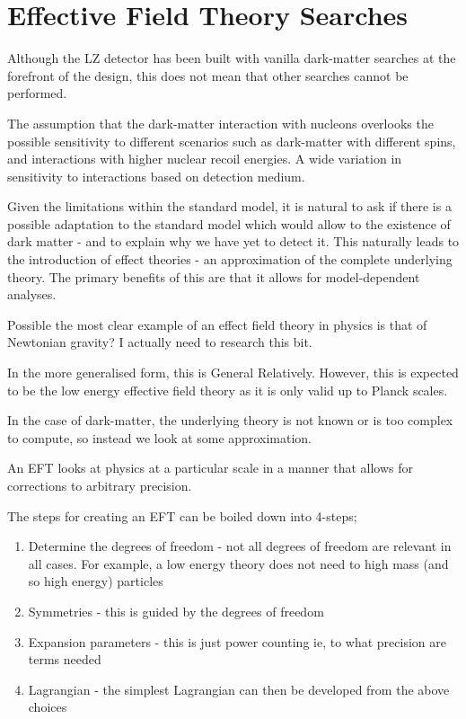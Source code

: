 \section{Effective Field Theory Searches} \label{eft_theory}

\par
Although the LZ detector has been built with vanilla dark-matter searches at the forefront of the design, this does not mean that other searches cannot be performed. 

\par
The assumption that the dark-matter interaction with nucleons overlooks the possible sensitivity to different scenarios such as dark-matter with different spins, and interactions with higher nuclear recoil energies.
A wide variation in sensitivity to interactions based on detection medium.

\par
Given the limitations within the standard model, it is natural to ask if there is a possible adaptation to the standard model which would allow to the existence of dark matter - and to explain why we have yet to detect it.
This naturally leads to the introduction of effect theories - an approximation of the complete underlying theory.
The primary benefits of this are that it allows for model-dependent analyses.

\par
Possible the most clear example of an effect field theory in physics is that of Newtonian gravity?
I actually need to research this bit.

\par
In the more generalised form, this is General Relatively.
However, this is expected to be the low energy effective field theory as it is only valid up to Planck scales.


\par
In the case of dark-matter, the underlying theory is not known or is too complex to compute, so instead we look at some approximation.

\par
An EFT looks at physics at a particular scale in a manner that allows for corrections to arbitrary precision.


\par
The steps for creating an EFT can be boiled down into 4-steps;
\begin{enumerate}
    \item Determine the degrees of freedom - not all degrees of freedom are relevant in all cases. For example, a low energy theory does not need to high mass (and so high energy) particles
    \item Symmetries - this is guided by the degrees of freedom
    \item Expansion parameters - this is just power counting ie, to what precision are terms needed
    \item Lagrangian - the simplest Lagrangian can then be developed from the above choices
\end{enumerate}


